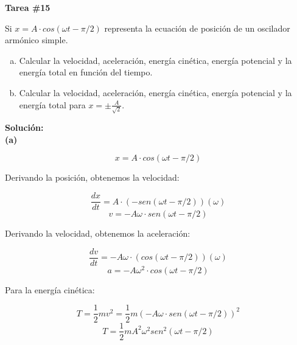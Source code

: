 \documentclass[letter,11pt]{article}
\begin{document}
\begin{center}
    {\Large \bf{Tarea \#15}}
\end{center}

Si $x = A \cdot cos(\omega t - \pi / 2)$ representa la ecuación de posición de
un oscilador armónico simple.

\begin{enumerate}[a)]
\item Calcular la velocidad, aceleración, energía cinética, energía potencial y
la energía total en función del tiempo.
\item Calcular la velocidad, aceleración, energía cinética, energía potencial y
la energía total para $x = \pm \frac{A}{\sqrt{2}}$.
\end{enumerate}

\vspace{0.5cm}
\textbf{Solución:} \\

\textbf{(a)}

\begin{equation}
    x = A \cdot cos(\omega t - \pi / 2)
\end{equation}

Derivando la posición, obtenemos la velocidad:

\begin{equation*}
    \frac{dx}{dt} = A \cdot ( -sen(\omega t - \pi / 2)) (\omega)
\end{equation*}
\begin{equation}
    v = -A \omega \cdot sen(\omega t - \pi / 2)
\end{equation}

Derivando la velocidad, obtenemos la aceleración:

\begin{equation*}
    \frac{dv}{dt} = -A \omega \cdot ( cos(\omega t - \pi / 2)) (\omega)
\end{equation*}
\begin{equation}
    a = -A \omega^2 \cdot cos(\omega t - \pi / 2)
\end{equation}

Para la energía cinética:

\begin{equation*}
    T = \frac{1}{2} m v^2 = \frac{1}{2} m ( -A \omega \cdot sen(\omega t - \pi / 2))^2
\end{equation*}
\begin{equation}
    T = \frac{1}{2} m A^2 \omega^2 sen^2(\omega t - \pi/2)
\end{equation}
\end{document}
